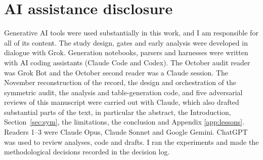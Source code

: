 \documentclass[10pt]{article}
\begin{document}
\section*{AI assistance disclosure}
Generative AI tools were used substantially in this work, and I am responsible for all of its content. The study design, gates and early analysis were developed in dialogue with Grok. Generation notebooks, parsers and harnesses were written with AI coding assistants (Claude Code and Codex). The October audit reader was Grok Bot and the October second reader was a Claude session. The November reconstruction of the record, the design and orchestration of the symmetric audit, the analysis and table-generation code, and five adversarial reviews of this manuscript were carried out with Claude, which also drafted substantial parts of the text, in particular the abstract, the Introduction, Section~\ref{sec:sym}, the limitations, the conclusion and Appendix \ref{app:lessons}. Readers 1--3 were Claude Opus, Claude Sonnet and Google Gemini. ChatGPT was used to review analyses, code and drafts. I ran the experiments and made the methodological decisions recorded in the decision log.
\end{document}
